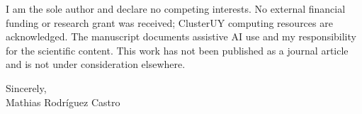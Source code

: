 \documentclass[11pt]{article}
\begin{document}
I am the sole author and declare no competing interests. No external financial
funding or research grant was received; ClusterUY computing resources
are acknowledged. The manuscript documents assistive AI use and my responsibility
for the scientific content. This work has not been published as a journal article
and is not under consideration elsewhere.

\bigskip
\noindent Sincerely,\\[6pt]
Mathias Rodr\'iguez Castro
\end{document}
